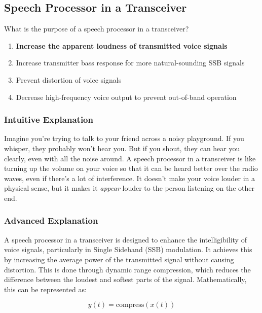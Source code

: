 \subsection{Speech Processor in a Transceiver}
\label{G4D01}

\begin{tcolorbox}[colback=gray!10!white,colframe=black!75!black,title=G4D01]
What is the purpose of a speech processor in a transceiver?
\begin{enumerate}[label=\Alph*,noitemsep]
    \item \textbf{Increase the apparent loudness of transmitted voice signals}
    \item Increase transmitter bass response for more natural-sounding SSB signals
    \item Prevent distortion of voice signals
    \item Decrease high-frequency voice output to prevent out-of-band operation
\end{enumerate}
\end{tcolorbox}

\subsubsection{Intuitive Explanation}
Imagine you're trying to talk to your friend across a noisy playground. If you whisper, they probably won't hear you. But if you shout, they can hear you clearly, even with all the noise around. A speech processor in a transceiver is like turning up the volume on your voice so that it can be heard better over the radio waves, even if there's a lot of interference. It doesn't make your voice louder in a physical sense, but it makes it \textit{appear} louder to the person listening on the other end.

\subsubsection{Advanced Explanation}
A speech processor in a transceiver is designed to enhance the intelligibility of voice signals, particularly in Single Sideband (SSB) modulation. It achieves this by increasing the average power of the transmitted signal without causing distortion. This is done through dynamic range compression, which reduces the difference between the loudest and softest parts of the signal. Mathematically, this can be represented as:

\[
y(t) = \text{compress}(x(t))
\]

